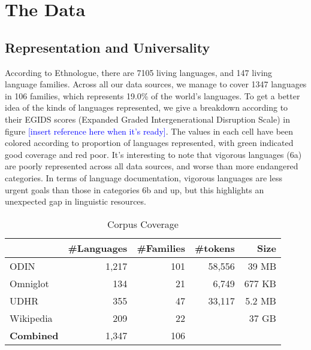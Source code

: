 \section{The Data}\label{sec:data}

\subsection{Representation and Universality} \label{sec:stats}

According to Ethnologue, there are 7105 living languages, and 147 living language families. Across all our data sources, we manage to cover 1347 languages in 106 families, which represents 19.0\% of the world's languages. To get a better idea of the kinds of languages represented, we give a breakdown according to their EGIDS scores (Expanded Graded Intergenerational Disruption Scale) in figure \textcolor{blue}{[insert reference here when it's ready]}. The values in each cell have been colored according to proportion of languages represented, with green indicated good coverage and red poor. It's interesting to note that vigorous languages (6a) are poorly represented across all data sources, and worse than more endangered categories. In terms of language documentation, vigorous languages are less urgent goals than those in categories 6b and up, but this highlights an unexpected gap in linguistic resources.


\begin{table}[h!]
\centering
    \begin{tabular}{l|rr|rr}
    ~         				& \#Languages & \#Families 	&\#tokens		& Size	\\ \hline
    ODIN      				& 1,217      & 101       		& 58,556		& 39 MB		\\
    Omniglot  				& 134        & 21        		&	6,749			& 677 KB	\\
    UDHR      				& 355        & 47        		&	33,117		& 5.2 MB	\\
    Wikipedia 				& 209        & 22       		&						& 37 GB		\\ \hline
    \textbf{Combined}	& 1,347			 & 106 
    \end{tabular}
\caption{Corpus Coverage}
\label{table:corpus}
\end{table}

